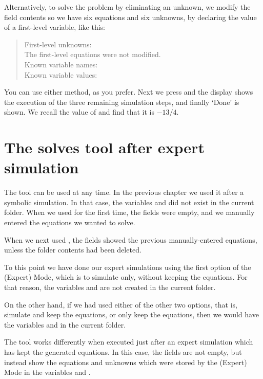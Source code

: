 Alternatively, to solve the problem by eliminating an unknown, we
modify the field contents so we have six equations and six unknowns,
by declaring the value of a first-level variable, like this:

\begin{quote}
First-level unknowns: \\
The first-level equations were not modified.\\
Known variable names: \\
Known variable values: 
\end{quote}

You can use either method, as you prefer. Next we press 
and the display shows the execution of the three remaining
simulation steps, and finally `Done' is shown. We recall the value
of  and find that it is $-13/4$.

\section{The solves tool after expert simulation}

The  tool can be used at any time. In the previous
chapter we used it after a symbolic simulation. In that case, the
variables  and  did not exist in the
current folder. When we used  for the first time, the
fields were empty, and we manually entered the equations we wanted
to solve.

When we next used , the fields showed the previous
manually-entered equations, unless the folder contents had been
deleted.

To this point we have done our expert simulations using the first
option of the (Expert) Mode, which is to simulate only, without
keeping the equations. For that reason, the variables
 and  are not created in the current
folder.

On the other hand, if we had used either of the other two options,
that is, simulate and keep the equations, or only keep the
equations, then we would have the variables  and
 in the current folder.

The  tool works differently when executed just after an
expert simulation which has kept the generated equations. In this
case, the fields are not empty, but instead show the equations and
unknowns which were stored by the (Expert) Mode in the variables
 and .

